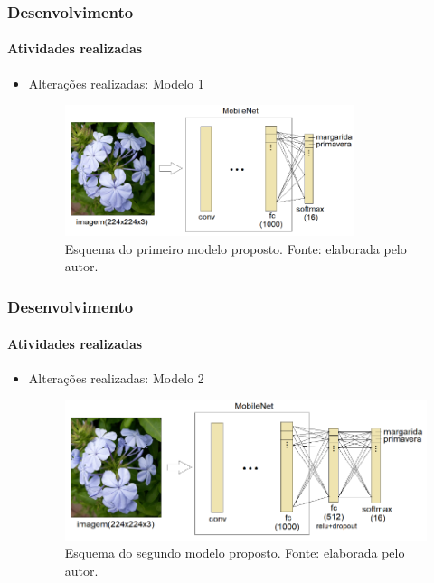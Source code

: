 \documentclass{beamer}
\begin{document}
     \begin{frame}[t]
      \frametitle{Desenvolvimento}
      \framesubtitle{Atividades realizadas}      
      \begin{itemize}
        \item<1-> Alterações realizadas: Modelo 1
        		 \begin{figure}[hbt]
      		 	\begin{center}
      				\includegraphics[width=0.8\textwidth]{img/model1.png}
      			\end{center}
      			\caption{Esquema do primeiro modelo proposto. Fonte: elaborada pelo autor.}
      		\end{figure}
      \end{itemize}
    \end{frame}
    
    \begin{frame}[t]
      \frametitle{Desenvolvimento}
      \framesubtitle{Atividades realizadas}      
      \begin{itemize}
        \item<1-> Alterações realizadas: Modelo 2
        		 \begin{figure}[hbt]
      		 	\begin{center}
      				\includegraphics[height=0.35\textwidth]{img/model2.png}
      			\end{center}
      			    \caption{Esquema do segundo modelo proposto. Fonte: elaborada pelo autor.}
      		\end{figure}
      \end{itemize}
    \end{frame}
    
\end{document}

